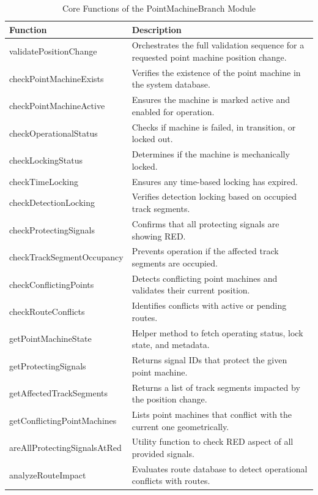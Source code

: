 \begin{table}[H]
    \centering
    \renewcommand{\arraystretch}{1.3}
    \caption{Core Functions of the PointMachineBranch Module}
    \begin{tabular}{p{5.2cm} p{10.2cm}}
        \toprule
        \textbf{Function} & \textbf{Description} \\
        \midrule
        validatePositionChange & Orchestrates the full validation sequence for a requested point machine position change. \\
        checkPointMachineExists & Verifies the existence of the point machine in the system database. \\
        checkPointMachineActive & Ensures the machine is marked active and enabled for operation. \\
        checkOperationalStatus & Checks if machine is failed, in transition, or locked out. \\
        checkLockingStatus & Determines if the machine is mechanically locked. \\
        checkTimeLocking & Ensures any time-based locking has expired. \\
        checkDetectionLocking & Verifies detection locking based on occupied track segments. \\
        checkProtectingSignals & Confirms that all protecting signals are showing RED. \\
        checkTrackSegmentOccupancy & Prevents operation if the affected track segments are occupied. \\
        checkConflictingPoints & Detects conflicting point machines and validates their current position. \\
        checkRouteConflicts & Identifies conflicts with active or pending routes. \\
        getPointMachineState & Helper method to fetch operating status, lock state, and metadata. \\
        getProtectingSignals & Returns signal IDs that protect the given point machine. \\
        getAffectedTrackSegments & Returns a list of track segments impacted by the position change. \\
        getConflictingPointMachines & Lists point machines that conflict with the current one geometrically. \\
        areAllProtectingSignalsAtRed & Utility function to check RED aspect of all provided signals. \\
        analyzeRouteImpact & Evaluates route database to detect operational conflicts with routes. \\
        \bottomrule
    \end{tabular}
    \label{tab:point-machine-branch-functions}
\end{table}
